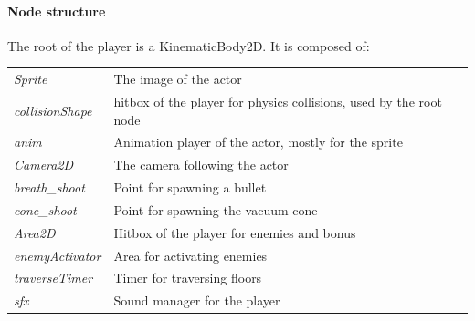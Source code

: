\documentclass[10pt,a4paper]{article}
\begin{document}
\paragraph{Node structure}
The root of the player is a KinematicBody2D.
It is composed of: \\
\begin{tabular}{ l  l }
  \textit{Sprite} & The image of the actor \\
  \textit{collisionShape} & hitbox of the player for physics collisions, used by the root node \\
  \textit{anim} & Animation player of the actor, mostly for the sprite \\
  \textit{Camera2D} & The camera following the actor \\
  \textit{breath\_shoot} & Point for spawning a bullet\\
  \textit{cone\_shoot} & Point for spawning the vacuum cone\\
  \textit{Area2D} & Hitbox of the player for enemies and bonus \\
  \textit{enemyActivator} & Area for activating enemies\\
  \textit{traverseTimer} & Timer for traversing floors\\
  \textit{sfx} & Sound manager for the player\\
\end{tabular}
\end{document}
